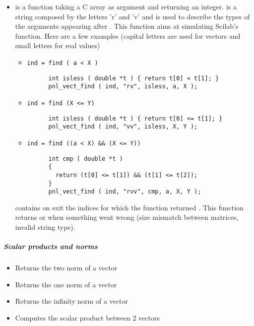 \begin{itemize}
\item {}
  \sshortdescribe {} is a function taking a C array as argument and
  returning an integer.  is a string composed by the letters 'r' and
  'v' and is used to describe the types of the arguments appearing after .
  This function aims at simulating Scilab's 
  function. Here are a few examples (capital letters are used for vectors and
  small letters for real values)
  \begin{itemize}
    \item \verb!ind = find ( a < X )!
      \begin{verbatim}
      int isless ( double *t ) { return t[0] < t[1]; }
      pnl_vect_find ( ind, "rv", isless, a, X );
      \end{verbatim}
    \item \verb!ind = find (X <= Y)!
      \begin{verbatim}
      int isless ( double *t ) { return t[0] <= t[1]; }
      pnl_vect_find ( ind, "vv", isless, X, Y );
      \end{verbatim}
    \item \verb!ind = find ((a < X) && (X <= Y))!
      \begin{verbatim}
      int cmp ( double *t ) 
      { 
        return (t[0] <= t[1]) && (t[1] <= t[2]); 
      }
      pnl_vect_find ( ind, "rvv", cmp, a, X, Y );
      \end{verbatim}
  \end{itemize}
   contains on exit the indices  for which the function 
  returned . This function returns  or  when something
  went wrong (size mismatch between matrices, invalid string type).

\end{itemize}

\subparagraph{Scalar products and norms}
\begin{itemize}
\item {}
  \sshortdescribe Returns the two norm of a vector  

\item {}
  \sshortdescribe Returns the one norm of a vector  

\item {}
  \sshortdescribe Returns the infinity norm of a vector  

\item {} 
  \sshortdescribe Computes the scalar product between 2 vectors  
\end{itemize}

